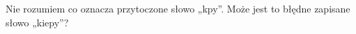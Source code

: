 \documentclass[a4paper,11pt]{article}
\numberwithin{equation}{section}
\begin{document}
\VerSpaceFour





\noindent
{} Nie rozumiem co oznacza przytoczone słowo „kpy”. Może
jest to błędne zapisane słowo „kiepy”?

\VerSpaceFour











\newpage

\end{document}
